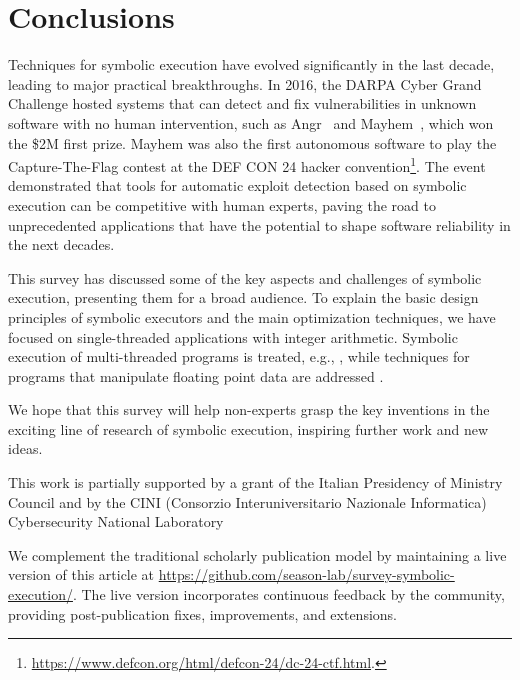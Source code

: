 
\vspace{-2pt} %
\section{Conclusions}
\label{se:conclusions}

Techniques for symbolic execution have evolved significantly in the last decade, leading to major practical breakthroughs. In 2016, the DARPA Cyber Grand Challenge hosted systems that can detect and fix vulnerabilities in unknown software with no human intervention, such as {\sc Angr}~\cite{ANGR-SSP16} and {\sc Mayhem}~\cite{MAYHEM-SP12}, which won the \$2M first prize. {\sc Mayhem} was also the first autonomous software to play the Capture-The-Flag contest at the DEF CON 24 hacker convention\footnote{\url{https://www.defcon.org/html/defcon-24/dc-24-ctf.html}.}. The event demonstrated that tools for automatic exploit detection based on symbolic execution can be competitive with human experts, paving the road to unprecedented applications %
that have the potential to shape software %
reliability in the next decades. 

This survey has discussed some of the key aspects and challenges of symbolic execution, presenting them for a broad audience. To explain the basic design principles of symbolic executors and the main optimization techniques, we have focused on single-threaded applications with integer arithmetic. Symbolic execution of multi-threaded programs is treated, e.g., , while techniques for programs that manipulate floating point data are addressed .

We hope that this survey will help non-experts grasp the key inventions in the exciting line of research of symbolic execution, inspiring further work and new ideas.


This work is partially supported by a grant of the Italian Presidency of Ministry Council and by the CINI  (Consorzio Interuniversitario Nazionale Informatica) Cybersecurity National Laboratory

\ifdefined\arxivver
{}
We complement the traditional scholarly publication model by maintaining a live version of this article at {\href{https://github.com/season-lab/survey-symbolic-execution}{https://github.com/season-lab/survey-symbolic-execution/}}. The live version incorporates continuous feedback by the community, providing post-publication fixes, improvements, and extensions.
\fi
